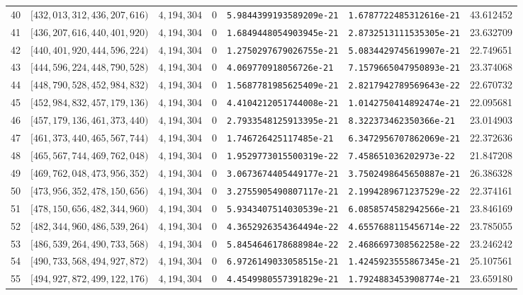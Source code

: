 \documentclass[11pt]{article}
\newcommand{\1}{\mathbf 1}
\theoremstyle{plain}
\theoremstyle{definition}
\theoremstyle{remark}
\begin{document}
\begin{landscape}
\begin{longtable}{@{}r r r r l l r@{}}
40 & $[432,013,312,436,207,616)$ & $4,194,304$ & 0 & \texttt{5.9844399193589209e-21} & \texttt{1.6787722485312616e-21} & 43.612452\\
41 & $[436,207,616,440,401,920)$ & $4,194,304$ & 0 & \texttt{1.6849448054903945e-21} & \texttt{2.8732513111535305e-21} & 23.632709\\
42 & $[440,401,920,444,596,224)$ & $4,194,304$ & 0 & \texttt{1.2750297679026755e-21} & \texttt{5.0834429745619907e-21} & 22.749651\\
43 & $[444,596,224,448,790,528)$ & $4,194,304$ & 0 & \texttt{4.069770918056726e-21} & \texttt{7.1579665047950893e-21} & 23.374068\\
44 & $[448,790,528,452,984,832)$ & $4,194,304$ & 0 & \texttt{1.5687781985625409e-21} & \texttt{2.8217942789569643e-22} & 22.670732\\
45 & $[452,984,832,457,179,136)$ & $4,194,304$ & 0 & \texttt{4.4104212051744008e-21} & \texttt{1.0142750414892474e-21} & 22.095681\\
46 & $[457,179,136,461,373,440)$ & $4,194,304$ & 0 & \texttt{2.7933548125913395e-21} & \texttt{8.322373462350366e-21} & 23.014903\\
47 & $[461,373,440,465,567,744)$ & $4,194,304$ & 0 & \texttt{1.746726425117485e-21} & \texttt{6.3472956707862069e-21} & 22.372636\\
48 & $[465,567,744,469,762,048)$ & $4,194,304$ & 0 & \texttt{1.9529773015500319e-22} & \texttt{7.458651036202973e-22} & 21.847208\\
49 & $[469,762,048,473,956,352)$ & $4,194,304$ & 0 & \texttt{3.0673674405449177e-21} & \texttt{3.7502498645650887e-21} & 26.386328\\
50 & $[473,956,352,478,150,656)$ & $4,194,304$ & 0 & \texttt{3.2755905490807117e-21} & \texttt{2.1994289671237529e-22} & 22.374161\\
51 & $[478,150,656,482,344,960)$ & $4,194,304$ & 0 & \texttt{5.9343407514030539e-21} & \texttt{6.0858574582942566e-21} & 23.846169\\
52 & $[482,344,960,486,539,264)$ & $4,194,304$ & 0 & \texttt{4.3652926354364494e-22} & \texttt{4.6557688115456714e-22} & 23.785055\\
53 & $[486,539,264,490,733,568)$ & $4,194,304$ & 0 & \texttt{5.8454646178688984e-22} & \texttt{2.4686697308562258e-22} & 23.246242\\
54 & $[490,733,568,494,927,872)$ & $4,194,304$ & 0 & \texttt{6.9726149033058515e-21} & \texttt{1.4245923555867345e-21} & 25.107561\\
55 & $[494,927,872,499,122,176)$ & $4,194,304$ & 0 & \texttt{4.4549980557391829e-21} & \texttt{1.7924883453908774e-21} & 23.659180\\

\end{longtable}
\end{landscape}
\end{document}

